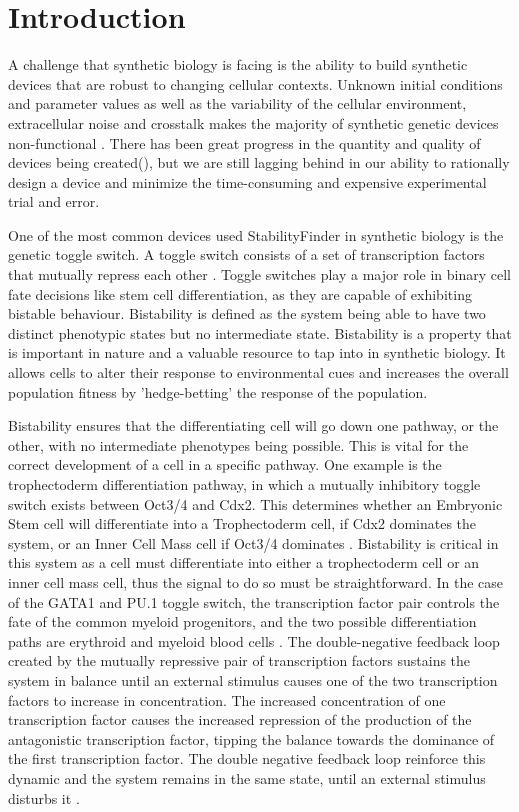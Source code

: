 \section{Introduction}

A challenge that synthetic biology is facing is the ability to build synthetic devices that are robust to changing cellular contexts. Unknown initial conditions and parameter values as well as the variability of the cellular environment, extracellular noise and crosstalk makes the majority of synthetic genetic devices non-functional \autocite{Chen:2009ea}. There has been great progress in the  quantity and quality of devices being created(), but we are still lagging behind in our ability to rationally design a device and minimize the time-consuming and expensive experimental trial and error. 

One of the most common devices used StabilityFinder in synthetic biology is the genetic toggle switch. A toggle switch consists of a set of transcription factors that mutually repress each other \autocite{Gardner:2000vha}. Toggle switches play a major role in binary cell fate decisions like stem cell differentiation, as they are capable of exhibiting bistable behaviour. Bistability is defined as the system being able to have two distinct phenotypic states but no intermediate state. Bistability is a property that is important in nature and a valuable resource to tap into in synthetic biology. It allows cells to alter their response to environmental cues and increases the overall population fitness by 'hedge-betting' the response of the population.

Bistability ensures that the differentiating cell will go down one pathway, or the other, with no intermediate phenotypes being possible. This is vital for the correct development of a cell in a specific pathway. One example is the trophectoderm differentiation pathway, in which a mutually inhibitory toggle switch exists between Oct3/4 and Cdx2. This determines whether an Embryonic Stem cell will differentiate into a Trophectoderm cell, if Cdx2 dominates the system, or an Inner Cell Mass cell if Oct3/4 dominates \autocite{Niwa:2005fz}. Bistability is critical in this system as a cell must differentiate into either a trophectoderm cell or an inner cell mass cell, thus the signal to do so must be straightforward. In the case of the GATA1 and PU.1 toggle switch, the transcription factor pair controls the fate of the common myeloid progenitors, and the two possible differentiation paths are erythroid and myeloid blood cells \autocite{Chickarmane:2009by}. The double-negative feedback loop created by the mutually repressive pair of transcription factors sustains the system in balance until an external stimulus causes one of the two transcription factors to increase in concentration. The increased concentration of one transcription factor causes the increased repression of the production of the antagonistic transcription factor, tipping the balance towards the dominance of the first transcription factor. The double negative feedback loop reinforce this dynamic and the system remains in the same state, until an external stimulus disturbs it \autocite{FerrellJr:2002fh}.

